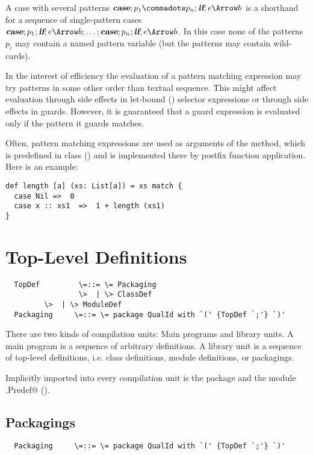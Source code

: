 \documentclass[11pt]{report}
\begin{document}
A case with several patterns $\CASE;p_1 \commadots p_n ;\IF; e \Arrow b$  is a
shorthand for a sequence of single-pattern cases $\CASE;p_1;\IF;e \Arrow b
;\ldots; \CASE;p_n ;\IF;e\Arrow b$. In this case none of the patterns
$p_i$ may contain a named pattern variable (but the patterns may contain
wild-cards).

In the interest of efficiency the evaluation of a pattern matching
expression may try patterns in some other order than textual
sequence. This might affect evaluation through side effects in
let-bound () selector expressions or through side
effects in guards. However, it is guaranteed that a guard expression
is evaluated only if the pattern it guards matches.


\example
Often, pattern matching expressions are used as arguments
of the \verb@match@ method, which is predefined in class \verb@Any@
() and is implemented there by postfix function
application. Here is an example:
\begin{verbatim}
def length [a] (xs: List[a]) = xs match {
  case Nil =>  0
  case x :: xs1  =>  1 + length (xs1)
}
\end{verbatim}

\chapter{Top-Level Definitions}
\label{sec:topdefs}

\syntax\begin{verbatim}
  TopDef         \=::= \= Packaging
                 \>  | \> ClassDef
		 \>  | \> ModuleDef
  Packaging     \=::= \= package QualId with `(' {TopDef `;'} `)'
\end{verbatim}

There are two kinds of compilation units: Main programs and library
units. A main program is a sequence of arbitrary definitions. A
library unit is a sequence of top-level definitions, i.e. class
definitions, module definitions, or packagings.

Implicitly imported into every compilation unit is the package
\verb@scala@ and the module \verb@scala.Predef@ ().

\section{Packagings}

\syntax\begin{verbatim}
  Packaging     \=::= \= package QualId with `(' {TopDef `;'} `)'
\end{verbatim}
\end{document}
